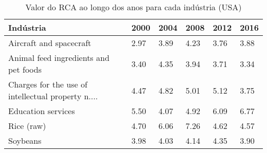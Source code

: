 \begin{table}
\centering
\caption{Valor do RCA ao longo dos anos para cada indústria (USA)}
\label{tab:ex3-tempo-USA}
\begin{tabular}{p{6cm}p{1.5cm}p{1.5cm}p{1.5cm}p{1.5cm}p{1.5cm}}
\toprule
                                         Indústria & 2000 & 2004 & 2008 & 2012 & 2016 \\
\midrule
                           Aircraft and spacecraft & 2.97 & 3.89 & 4.23 & 3.76 & 3.88 \\
             Animal feed ingredients and pet foods & 3.40 & 4.35 & 3.94 & 3.71 & 3.34 \\
Charges for the use of intellectual property n.... & 4.47 & 4.82 & 5.01 & 5.12 & 3.75 \\
                                Education services & 5.50 & 4.07 & 4.92 & 6.09 & 6.77 \\
                                        Rice (raw) & 4.70 & 6.06 & 7.26 & 4.62 & 4.57 \\
                                          Soybeans & 3.98 & 4.03 & 4.14 & 4.35 & 3.90 \\
\bottomrule
\end{tabular}
\end{table}
